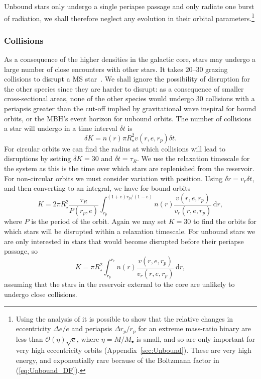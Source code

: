 \documentclass[useAMS,usedcolumn,usegraphicx,usenatbib]{mn2e}
\newcommand{\eqnref}[1]{(\ref{eq:#1})}
\newcommand{\apref}[1]{Appendix~\ref{sec:#1}}
\newcommand{\dd}{\ensuremath{\mathrm{d}}}
\newcommand{\intd}[4]{\ensuremath{\int_{#1}^{#2}{#3}\,\dd{#4}}}
\newcommand{\order}[1]{\ensuremath{\mathcal{O}({#1})}}
\begin{document}
Unbound stars only undergo a single periapse passage and only radiate one burst of radiation, we shall therefore neglect any evolution in their orbital parameters.\footnote{Using the analysis of \citet{Turner1977} it is possible to show that the relative changes in eccentricity $\Delta e / e$ and periapsis $\Delta r_p / r_p$ for an extreme mass-ratio binary are less than $\order{\eta}\sqrt{e}$, where $\eta = M/M_\bullet$ is small, and so are only important for very high eccentricity orbits (\apref{Unbound}). These are very high energy, and exponentially rare because of the Boltzmann factor in \eqnref{Unbound_DF}.}

\subsubsection{Collisions}

As a consequence of the higher densities in the galactic core, stars may undergo a large number of close encounters with other stars. It takes $20$--$30$ grazing collisions to disrupt a MS star~\citep{Freitag2006}. We shall ignore the possibility of disruption for the other species since they are harder to disrupt: as a consequence of smaller cross-sectional areas, none of the other species would undergo 30 collisions with a periapsis greater than the cut-off implied by gravitational wave inspiral for bound orbits, or the MBH's event horizon for unbound orbits. The number of collisions a star will undergo in a time interval $\delta t$ is
\begin{equation}
\delta K = n(r) \pi R_\star^2 v(r,e,r_p)\delta t.
\end{equation}
For circular orbits we can find the radius at which collisions will lead to disruptions by setting $\delta K = 30$ and $\delta t = \tau_R$. We use the relaxation timescale for the system as this is the time over which stars are replenished from the reservoir. For non-circular orbits we must consider variation with position. Using $\delta r = v_r \delta t$, and then converting to an integral, we have for bound orbits
\begin{equation}
K = 2\pi R_\star^2 \frac{\tau_R}{P(r_p,e)}\intd{r_p}{(1+e)r_p/(1-e)}{n(r)\frac{v(r,e,r_p)}{v_r(r,e,r_p)}}{r},
\end{equation}
where $P$ is the period of the orbit. Again we may set $K = 30$ to find the orbits for which stars will be disrupted within a relaxation timescale. For unbound stars we are only interested in stars that would become disrupted before their periapse passage, so
\begin{equation}
K = \pi R_\star^2 \intd{r_p}{r_c}{n(r)\frac{v(r,e,r_p)}{v_r(r,e,r_p)}}{r},
\end{equation}
assuming that the stars in the reservoir external to the core are unlikely to undergo close collisions.
\end{document}
